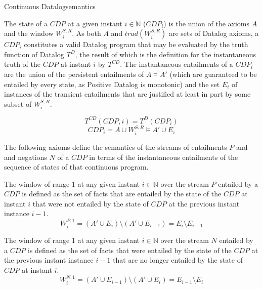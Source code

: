 \begin{nestedsection}{Continuous Datalog}{semantics}
\begin{definition}
\label{def:continuous datalog: CDPt}

The state of a ${CDP}$ at a given instant ${i \in \mathbb{N}}$
(${CDP_{i}}$) is the union of the axioms $A$ and the window
$W^{S,R}_{i}$.  As both $A$ and ${trad\left( W^{S,R}_{i} \right)}$ are
sets of Datalog axioms, a ${CDP_{i}}$ constitutes a valid Datalog
program that may be evaluated by the truth function of Datalog
$T^{D}$, the result of which is the definition for the instantaneous
truth of the ${CDP}$ at instant $i$ by $T^{CD}$.  The instantaneous
entailments of a $CDP_{i}$ are the union of the persistent entailments
of ${A \vDash A'}$ (which are guaranteed to be entailed by every
state, as Positive Datalog is monotonic) and the set $E_{i}$ of
instances of the transient entailments that are justified at least in
part by some subset of $W^{S,R}_{i}$.

\begin{equation*}
T^{CD} \left( CDP, i \right) = T^{D} \left( CDP_{i} \right)
\end{equation*}
\begin{equation*}
CDP_{i} = A \cup W^{S,R}_{i} \vDash A' \cup E_{i}
\end{equation*}
\end{definition}


	The following axioms define the semantics of the streams of entailments $P$ and and negations $N$ of a ${CDP}$ in terms of the instantaneous entailments of the sequence of states of that continuous program.

\begin{axiom}
\label{axiom:continuous datalog: positive window increment}
The window of range 1 at any given instant ${i \in \mathbb{N}}$ over
the stream $P$ entailed by a ${CDP}$ is defined as the set of facts
that are entailed by the state of the ${CDP}$ at instant $i$ that were
not entailed by the state of ${CDP}$ at the previous instant instance
${i-1}$.
			\begin{equation*}
				W^{P,1}_{i} = \left( A' \cup E_{i} \right) \setminus \left( A' \cup E_{i-1} \right) = E_{i} \setminus E_{i-1}
			\end{equation*}
\end{axiom}

\begin{axiom}
\label{axiom:continuous datalog: negative window increment}
			The window of range 1 at any given instant ${i \in \mathbb{N}}$ over the stream $N$ entailed by a ${CDP}$ is defined as the set of facts that were entailed by the state of the ${CDP}$ at the previous instant instance ${i-1}$ that are no longer entailed by the state of ${CDP}$ at instant $i$.
			\begin{equation*}
				W^{N,1}_{i} = \left( A' \cup E_{i-1} \right) \setminus \left( A' \cup E_{i} \right) = E_{i-1} \setminus E_{i}
			\end{equation*}
\end{axiom}


\end{nestedsection}
